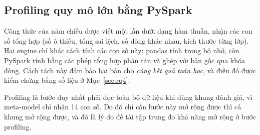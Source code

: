 \subsection{Profiling quy mô lớn bằng PySpark}

Công thức của năm chiều được viết một lần dưới dạng hàm thuần, nhận các con số tổng hợp (số ô thiếu, tổng sai lệch, số dòng khác nhau, kích thước từng lớp). Hai engine chỉ khác cách tính các con số này: pandas tính trong bộ nhớ, còn PySpark tính bằng các phép tổng hợp phân tán và ghép với bản gốc qua khóa dòng. Cách tách này đảm bảo hai bản cho \emph{cùng kết quả toán học}, và điều đó được kiểm chứng bằng số liệu ở Mục~\ref{sec:rq4}.

Profiling là bước duy nhất phải đọc toàn bộ dữ liệu khi dùng khung đánh giá, vì meta-model chỉ nhận 14 con số. Do đó chỉ cần bước này mở rộng được thì cả khung mở rộng được, và đó là lý do đề tài tập trung đo khả năng mở rộng ở bước profiling.
